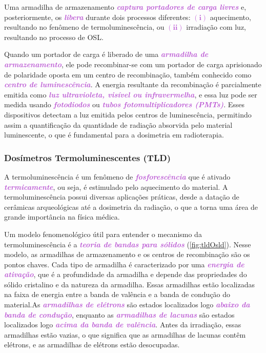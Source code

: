 \documentclass[11pt,a4paper]{article}
\begin{document}
	Uma armadilha de armazenamento \textcolor{MediumOrchid}{\textit{\textbf{captura portadores de carga livres}}} e, posteriormente, os \textcolor{MediumOrchid}{\textit{\textbf{libera}}} durante dois processos diferentes: \textcolor{MediumOrchid}{$\mathbf{(i)}$} aquecimento, resultando no fenômeno de termoluminescência, ou \textcolor{MediumOrchid}{$\mathbf{(ii)}$} irradiação com luz, resultando no processo de OSL.

	Quando um portador de carga é liberado de uma \textcolor{MediumOrchid}{\textit{\textbf{armadilha de armazenamento}}}, ele pode recombinar-se com um portador de carga aprisionado de polaridade oposta em um centro de recombinação, também conhecido como \textcolor{MediumOrchid}{\textit{\textbf{centro de luminescência}}}. A energia resultante da recombinação é parcialmente emitida como \textcolor{MediumOrchid}{\textit{\textbf{luz ultravioleta, visível ou infravermelha}}}, e essa luz pode ser medida usando \textcolor{MediumOrchid}{\textit{\textbf{fotodiodos}}} ou \textcolor{MediumOrchid}{\textit{\textbf{tubos fotomultiplicadores (PMTs)}}}. Esses dispositivos detectam a luz emitida pelos centros de luminescência, permitindo assim a quantificação da quantidade de radiação absorvida pelo material luminescente, o que é fundamental para a dosimetria em radioterapia.

\subsubsection*{Dosímetros Termoluminescentes (TLD)}

	A termoluminescência é um fenômeno de \textcolor{MediumOrchid}{\textit{\textbf{fosforescência}}} que é ativado \textcolor{MediumOrchid}{\textit{\textbf{termicamente}}}, ou seja, é estimulado pelo aquecimento do material. A termoluminescência possui diversas aplicações práticas, desde a datação de cerâmicas arqueológicas até a dosimetria da radiação, o que a torna uma área de grande importância na física médica.

	Um modelo fenomenológico útil para entender o mecanismo da termoluminescência é a \textcolor{MediumOrchid}{\textit{\textbf{teoria de bandas para sólidos}}} (\ref{fig:tldOsld}). Nesse modelo, as armadilhas de armazenamento e os centros de recombinação são os pontos chaves. Cada tipo de armadilha é caracterizado por uma \textcolor{MediumOrchid}{\textit{\textbf{energia de ativação}}}, que é a profundidade da armadilha e depende das propriedades do sólido cristalino e da natureza da armadilha. Essas armadilhas estão localizadas na faixa de energia entre a banda de valência e a banda de condução do material.As \textcolor{MediumOrchid}{\textit{\textbf{armadilhas de elétrons}}} são estados localizados logo \textcolor{MediumOrchid}{\textit{\textbf{abaixo da banda de condução}}}, enquanto as \textcolor{MediumOrchid}{\textit{\textbf{armadilhas de lacunas}}} são estados localizados logo \textcolor{MediumOrchid}{\textit{\textbf{acima da banda de valência}}}. Antes da irradiação, essas armadilhas estão vazias, o que significa que as armadilhas de lacunas contêm elétrons, e as armadilhas de elétrons estão desocupadas.
\end{document}

